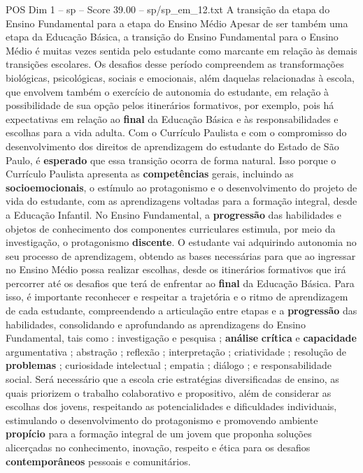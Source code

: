 \begin{textsample}{POS Dim 1 – sp – Score 39.00 – sp/sp\_em\_12.txt}  \label{ex:f1_pos_118}
A transição da etapa do Ensino Fundamental para a etapa do Ensino Médio Apesar de ser também uma etapa da Educação Básica, a transição do Ensino Fundamental para o Ensino Médio é muitas vezes sentida pelo estudante como marcante em relação às demais transições escolares.
Os desafios desse período compreendem as transformações biológicas, psicológicas, sociais e emocionais, além daquelas relacionadas à escola, que envolvem também o exercício de autonomia do estudante, em relação à possibilidade de sua opção pelos itinerários formativos, por exemplo, pois há expectativas em relação ao \textbf{final} da Educação Básica e às responsabilidades e escolhas para a vida adulta.
Com o Currículo Paulista e com o compromisso do desenvolvimento dos direitos de aprendizagem do estudante do Estado de São Paulo, é \textbf{esperado} que essa transição ocorra de forma natural.
Isso porque o Currículo Paulista apresenta as \textbf{competências} gerais, incluindo as \textbf{socioemocionais}, o estímulo ao protagonismo e o desenvolvimento do projeto de vida do estudante, com as aprendizagens voltadas para a formação integral, desde a Educação Infantil.
No Ensino Fundamental, a \textbf{progressão} das habilidades e objetos de conhecimento dos componentes curriculares estimula, por meio da investigação, o protagonismo \textbf{discente}.
O estudante vai adquirindo autonomia no seu processo de aprendizagem, obtendo as bases necessárias para que ao ingressar no Ensino Médio possa realizar escolhas, desde os itinerários formativos que irá percorrer até os desafios que terá de enfrentar ao \textbf{final} da Educação Básica.
Para isso, é importante reconhecer e respeitar a trajetória e o ritmo de aprendizagem de cada estudante, compreendendo a articulação entre etapas e a \textbf{progressão} das habilidades, consolidando e aprofundando as aprendizagens do Ensino Fundamental, tais como : investigação e pesquisa ; \textbf{análise} \textbf{crítica} e \textbf{capacidade} argumentativa ; abstração ; reflexão ; interpretação ; criatividade ; resolução de \textbf{problemas} ; curiosidade intelectual ; empatia ; diálogo ; e responsabilidade social.
Será necessário que a escola crie estratégias diversificadas de ensino, as quais priorizem o trabalho colaborativo e propositivo, além de considerar as escolhas dos jovens, respeitando as potencialidades e dificuldades individuais, estimulando o desenvolvimento do protagonismo e promovendo ambiente \textbf{propício} para a formação integral de um jovem que proponha soluções alicerçadas no conhecimento, inovação, respeito e ética para os desafios \textbf{contemporâneos} pessoais e comunitários.

\end{textsample}
